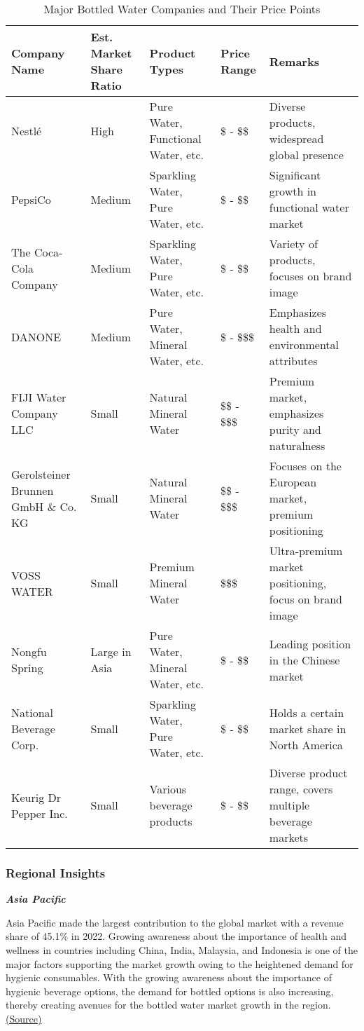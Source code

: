 \documentclass{article}
\begin{document}
\begin{table}[H]
\centering
\small
\begin{tabularx}{\textwidth}{|>{\centering\arraybackslash}X|>{\centering\arraybackslash}X|>{\centering\arraybackslash}X|>{\centering\arraybackslash}X|>{\centering\arraybackslash}X|}
\hline
\textbf{Company Name} & \textbf{Est. Market Share Ratio} & \textbf{Product Types} & \textbf{Price Range} & \textbf{Remarks} \\ \hline
Nestlé & High & Pure Water, Functional Water, etc. & \$ - \$\$ & Diverse products, widespread global presence \\ \hline
PepsiCo & Medium & Sparkling Water, Pure Water, etc. & \$ - \$\$ & Significant growth in functional water market \\ \hline
The Coca-Cola Company & Medium & Sparkling Water, Pure Water, etc. & \$ - \$\$ & Variety of products, focuses on brand image \\ \hline
DANONE & Medium & Pure Water, Mineral Water, etc. & \$ - \$\$\$ & Emphasizes health and environmental attributes \\ \hline
FIJI Water Company LLC & Small & Natural Mineral Water & \$\$ - \$\$\$ & Premium market, emphasizes purity and naturalness \\ \hline
Gerolsteiner Brunnen GmbH \& Co. KG & Small & Natural Mineral Water & \$\$ - \$\$\$ & Focuses on the European market, premium positioning \\ \hline
VOSS WATER & Small & Premium Mineral Water & \$\$\$ & Ultra-premium market positioning, focus on brand image \\ \hline
Nongfu Spring & Large in Asia & Pure Water, Mineral Water, etc. & \$ - \$\$ & Leading position in the Chinese market \\ \hline
National Beverage Corp. & Small & Sparkling Water, Pure Water, etc. & \$ - \$\$ & Holds a certain market share in North America \\ \hline
Keurig Dr Pepper Inc. & Small & Various beverage products & \$ - \$\$ & Diverse product range, covers multiple beverage markets \\ \hline
\end{tabularx}
\caption{Major Bottled Water Companies and Their Price Points}
\label{table:bottled_water_companies}
\end{table}

\subsubsection{Regional Insights}
\textit{\textbf{Asia Pacific}}\par
Asia Pacific made the largest contribution to the global market with a revenue share of 45.1\% in 2022. Growing awareness about the importance of health and wellness in countries including China, India, Malaysia, and Indonesia is one of the major factors supporting the market growth owing to the heightened demand for hygienic consumables. With the growing awareness about the importance of hygienic beverage options, the demand for bottled options is also increasing, thereby creating avenues for the bottled water market growth in the region.\href{https://www.grandviewresearch.com/industry-analysis/bottled-water-market}{(Source)}
\end{document}
